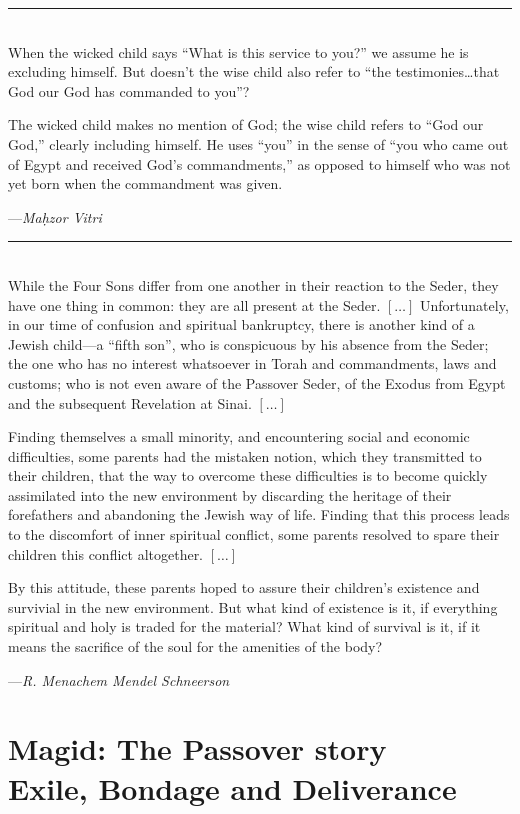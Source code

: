 \documentclass[a4paper,12pt,openany]{memoir}
\newcommand{\HgEllipsis}{\ensuremath{\left[\ldots\right]}}
\newcommand{\HgSource}[1]{\hfill{\small---\itshape{#1}}}
\newcommand{\HgFill}{\vfill \hrule \vfill}
\newenvironment{HgEnglish}{\strut\\\noindent}{\vspace{1em}}
\newcommand{\LSrc}{\textsuperscript{\upshape{[L]}}}
\begin{document}
\HgFill

\begin{HgEnglish}
  When the wicked child says “What is this service to you?” we assume he is
  excluding himself. But doesn’t the wise child also refer to “the
  testimonies\ldots{}that God our God has commanded to you”?

  The wicked child makes no mention of God; the wise child refers to “God our
  God,” clearly including himself. He uses “you” in the sense of “you who came
  out of Egypt and received God’s commandments,” as opposed to himself who was
  not yet born when the commandment was given.

  \HgSource{Ma\d{h}zor Vitri \LSrc}
\end{HgEnglish}

\HgFill

\begin{HgEnglish}
  While the Four Sons differ from one another in their reaction to the Seder,
  they have one thing in common: they are all present at the Seder.
  \HgEllipsis{} Unfortunately, in our time of confusion and spiritual
  bankruptcy, there is another kind of a Jewish child---a ``fifth son'', who is
  conspicuous by his absence from the Seder; the one who has no interest
  whatsoever in Torah and commandments, laws and customs; who is not even aware
  of the Passover Seder, of the Exodus from Egypt and the subsequent Revelation
  at Sinai. \HgEllipsis

  Finding themselves a small minority, and encountering social and economic
  difficulties, some parents had the mistaken notion, which they transmitted to
  their children, that the way to overcome these difficulties is to become
  quickly assimilated into the new environment by discarding the heritage of
  their forefathers and abandoning the Jewish way of life. Finding that this
  process leads to the discomfort of inner spiritual conflict, some parents
  resolved to spare their children this conflict altogether. \HgEllipsis

  By this attitude, these parents hoped to assure their children's existence and
  survivial in the new environment. But what kind of existence is it, if
  everything spiritual and holy is traded for the material? What kind of
  survival is it, if it means the sacrifice of the soul for the amenities of the
  body?

  \HgSource{R. Menachem Mendel Schneerson}
\end{HgEnglish}


\chapter*{Magid: The Passover story \\ {\LARGE Exile, Bondage and Deliverance}}
\end{document}

